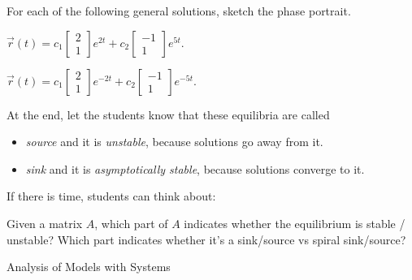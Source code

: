 \question
	For each of the following general solutions, sketch the phase portrait.
\begin{parts}
	\item $	\vec{r}(t) = c_1 \begin{bmatrix} 2 \\ 1 \end{bmatrix} e^{2t} + c_2 \begin{bmatrix} -1 \\ 1 \end{bmatrix} e^{5t}.$
	\item $	\vec{r}(t) = c_1 \begin{bmatrix} 2 \\ 1 \end{bmatrix} e^{-2t} + c_2 \begin{bmatrix} -1 \\ 1 \end{bmatrix} e^{-5t}.$	
\end{parts}
\begin{annotation}
	\begin{goals}
	At the end, let the students know that these equilibria are called 
	\begin{itemize}
		\item \emph{source} and it is \emph{unstable}, because solutions go away from it.
		\item \emph{sink} and it is \emph{asymptotically stable}, because solutions converge to it.
	\end{itemize}
	
	If there is time, students can think about:

	Given a matrix $A$, which part of $A$ indicates whether the equilibrium is stable / unstable? Which part indicates whether it's a sink/source vs spiral sink/source?
	\end{goals}
\end{annotation}





\standardonlynewpage

%
%



\begin{module}{Analysis of Models with Systems}
	\label{sys:analysis}

	
	
\end{module}



